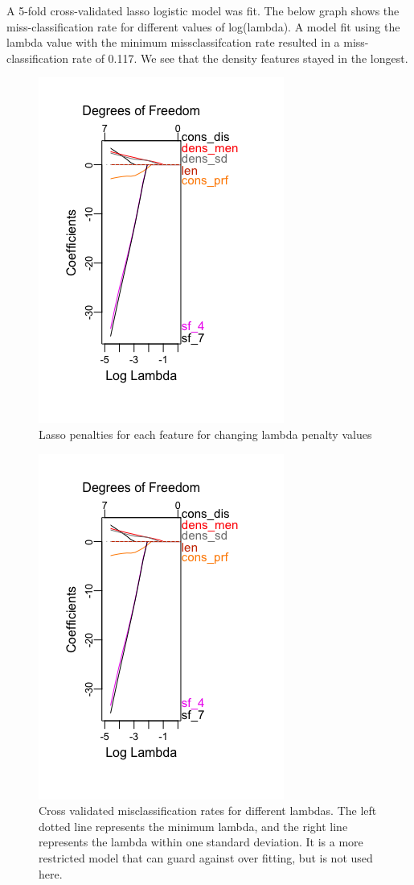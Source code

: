 \documentclass[12pt,twoside]{reedthesis}
\theoremstyle{definition}
\theoremstyle{definition}
\theoremstyle{definition}
\theoremstyle{remark}
\begin{document}
A 5-fold cross-validated lasso logistic model was fit. The below graph
shows the miss-classification rate for different values of log(lambda).
A model fit using the lambda value with the minimum missclassifcation
rate resulted in a miss-classification rate of 0.117. We see that the
density features stayed in the longest.
\begin{figure}[h]
\centering
\includegraphics[scale = .5]{images/lasso_bach.png}
\caption{Lasso penalties for each feature for changing lambda penalty values}
\label{subd}
\end{figure}
\begin{figure}[h]
\centering
\includegraphics[scale = .5]{images/lasso_bach.png}
\caption{Cross validated misclassification rates for different lambdas. The left dotted line represents the minimum lambda, and the right line represents the lambda within one standard deviation. It is a more restricted model that can guard against over fitting, but is not used here.}
\label{subd}
\end{figure}
\end{document}
